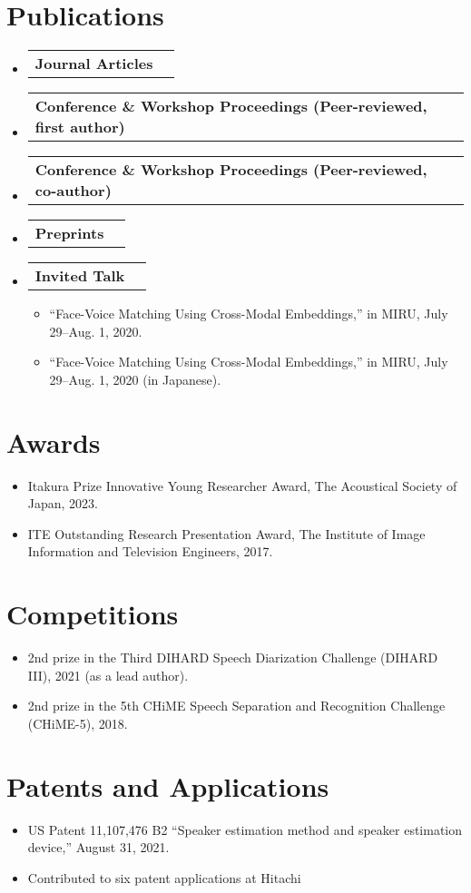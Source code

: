 \documentclass[letterpaper,11pt]{article}
\makeatletter
\newcommand{\resumeItem}[1]{
  \item\small{
    {#1 \vspace{-2pt}}
  }
}
\newcommand{\resumeShortSubheading}[2]{
  \vspace{-2pt}\item
    \begin{tabular*}{0.97\textwidth}[t]{l@{\extracolsep{\fill}}r}
      \textbf{#1} & #2 \\
    \end{tabular*}\vspace{-7pt}
}
\newcommand{\resumeSubHeadingListStart}{\begin{itemize}[leftmargin=0.15in, label={}]}
\newcommand{\resumeSubHeadingListEnd}{\end{itemize}}
\newcommand{\resumeItemListStart}{\begin{itemize}}
\newcommand{\resumeItemListEnd}{\end{itemize}\vspace{-5pt}}
\makeatother
\begin{document}
\section{Publications}
  \resumeSubHeadingListStart
    \resumeShortSubheading
      {Journal Articles}{}
      \nocite{*}
      \printbibliography[type=article,heading=none]
    \resumeShortSubheading
      {Conference \& Workshop Proceedings (Peer-reviewed, first author)}{}
      \printbibliography[type=inproceedings,heading=none,keyword=first]
    \resumeShortSubheading
      {Conference \& Workshop Proceedings (Peer-reviewed, co-author)}{}
      \printbibliography[type=inproceedings,heading=none,notkeyword=first]
    \resumeShortSubheading
      {Preprints}{}
      \printbibliography[type=misc,heading=none]
    \resumeShortSubheading
      {\textbf{Invited Talk}}{}
      \resumeItemListStart
        \resumeItem{``Face-Voice Matching Using Cross-Modal Embeddings,'' in MIRU, July 29--Aug. 1, 2020.}
        \resumeItem{``Face-Voice Matching Using Cross-Modal Embeddings,'' in MIRU, July 29--Aug. 1, 2020 (in Japanese).}
      \resumeItemListEnd
  \resumeSubHeadingListEnd

\section{Awards}
  \resumeItemListStart
    \resumeItem{Itakura Prize Innovative Young Researcher Award, The Acoustical Society of Japan, 2023.}
    \resumeItem{ITE Outstanding Research Presentation Award, The Institute of Image Information and Television Engineers, 2017.}
  \resumeItemListEnd

\section{Competitions}
  \resumeItemListStart
    \resumeItem{2nd prize in the Third DIHARD Speech Diarization Challenge (DIHARD III), 2021  (as a lead author).}
    \resumeItem{2nd prize in the 5th CHiME Speech Separation and Recognition Challenge (CHiME-5), 2018.}
  \resumeItemListEnd

\section{Patents and Applications}
  \resumeItemListStart
    \resumeItem{US Patent 11,107,476 B2 ``Speaker estimation method and speaker estimation device,'' August 31, 2021.}
    \resumeItem{Contributed to six patent applications at Hitachi}
  \resumeItemListEnd
  
\end{document}
